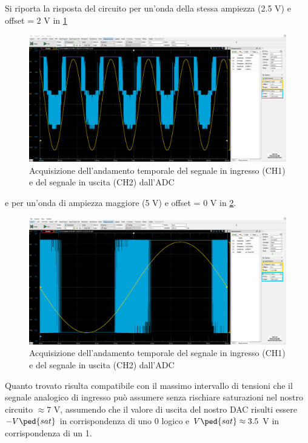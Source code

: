 \documentclass[10pt, a4paper, italian]{article}
\begin{document}
Si riporta la risposta del circuito per un'onda della stessa ampiezza (2.5 V)
e offset = 2 V in \cref{fig: sinofs}
\begin{figure}[htbp]
    \centering
	\includegraphics[width=\textwidth]{sin10hz2.5vofs2v}
    \caption{Acquisizione dell'andamento temporale del segnale in ingresso
    (CH1) e del segnale in uscita (CH2) dall'ADC
    \label{fig: sinofs}}
\end{figure}
e per un'onda di ampiezza maggiore (5 V) e offset = 0 V in \cref{fig: sinsat}.
\begin{figure}[htbp]
    \centering
	\includegraphics[width=\textwidth]{sin10hz5v}
    \caption{Acquisizione dell'andamento temporale del segnale in ingresso
    (CH1) e del segnale in uscita (CH2) dall'ADC
    \label{fig: sinsat}}
\end{figure}

Quanto trovato risulta compatibile con il massimo intervallo di tensioni che
il segnale analogico di ingresso può assumere senza rischiare saturazioni nel
nostro circuito $\approx 7$ V, assumendo che il valore di uscita del nostro
DAC risulti essere $-V\ped{sat}$ in corrispondenza di uno 0 logico e
$V\ped{sat} \approx 3.5$ V in corrispondenza di un 1.
\end{document}
